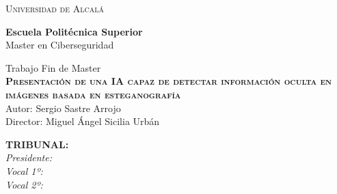 
\begin{center}
\LARGE \textsc{Universidad de Alcalá}\\
\vspace{0.5cm}

\textbf{Escuela Politécnica Superior}\\

Master en Ciberseguridad
\end{center}

\vspace{0.5cm}

\begin{center}
\end{center}


\begin{center}
\vspace{1cm}

\LARGE Trabajo Fin de Master\\
\textbf{\Huge \textsc{{Presentación de una IA capaz de detectar información oculta en imágenes basada en esteganografía}}}\\
\vspace{0.5cm}
\large Autor: Sergio Sastre Arrojo\\
Director: Miguel Ángel Sicilia Urbán\\
\vspace{0.5cm}
\end{center}

\begin{flushleft}
\textbf{TRIBUNAL:}\\
\vspace{1.5cm}
\textit{Presidente: }\\
\vspace{1.5cm}
\textit{Vocal 1º: }\\
\vspace{1.5cm}
\textit{Vocal 2º: }\\
\vspace{1.5cm}
\end{flushleft}

\newpage
\thispagestyle{empty}
\hspace*{0.5cm}
\newpage
